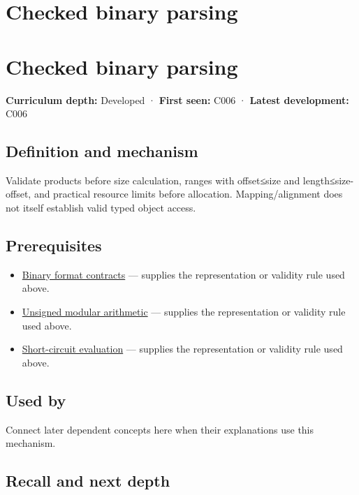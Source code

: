 \hypertarget{appendix-652d81568de9}{}
\section*{Checked binary parsing}
\section{Checked binary parsing}\label{appendix-652d81568de9-checked-binary-parsing}

\textbf{Curriculum depth:} Developed · \textbf{First seen:} C006 · \textbf{Latest development:} C006

\subsection{Definition and mechanism}\label{appendix-652d81568de9-definition-and-mechanism}

Validate products before size calculation, ranges with offset≤size and length≤size-offset, and practical resource limits before allocation. Mapping/alignment does not itself establish valid typed object access.

\subsection{Prerequisites}\label{appendix-652d81568de9-prerequisites}

\begin{itemize}
\tightlist
\item
  \hyperref[appendix-590bbb2424c1]{Binary format contracts} --- supplies the representation or validity rule used above.
\item
  \hyperref[appendix-c99977d88b33]{Unsigned modular arithmetic} --- supplies the representation or validity rule used above.
\item
  \hyperref[appendix-2e245a6fa8d3]{Short-circuit evaluation} --- supplies the representation or validity rule used above.
\end{itemize}

\subsection{Used by}\label{appendix-652d81568de9-used-by}

Connect later dependent concepts here when their explanations use this mechanism.

\subsection{Recall and next depth}\label{appendix-652d81568de9-recall-and-next-depth}

